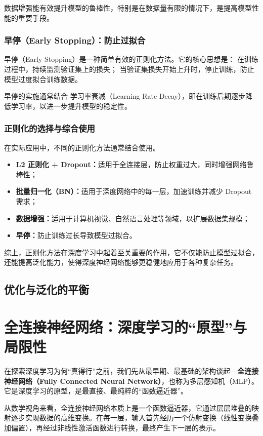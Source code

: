 数据增强能有效提升模型的鲁棒性，特别是在数据量有限的情况下，是提高模型性能的重要手段。

\subsubsection*{早停（Early Stopping）：防止过拟合}
早停（Early Stopping）是一种简单有效的正则化方法。它的核心思想是： 在训练过程中，持续监测验证集上的损失； 当验证集损失开始上升时，停止训练，防止模型过度拟合训练数据。

早停的实施通常结合 学习率衰减（Learning Rate Decay），即在训练后期逐步降低学习率，以进一步提升模型的稳定性。

\subsubsection*{ 正则化的选择与综合使用}
在实际应用中，不同的正则化方法通常结合使用。
\begin{itemize}
\item {\bf   L2 正则化 + Dropout：}适用于全连接层，防止权重过大，同时增强网络鲁棒性；
\item {\bf   批量归一化（BN）：}适用于深度网络中的每一层，加速训练并减少 Dropout 需求；
\item {\bf  数据增强：}适用于计算机视觉、自然语言处理等领域，以扩展数据集规模；
\item {\bf  早停：}防止训练过长导致模型过拟合。
\end{itemize}
综上，正则化方法在深度学习中起着至关重要的作用，它不仅能防止模型过拟合，还能提高泛化能力，使得深度神经网络能够更稳健地应用于各种复杂任务。
 
 \subsection{优化与泛化的平衡}
 

\section{全连接神经网络：深度学习的“原型”与局限性}
在探索深度学习为何“真得行”之前，我们先从最早期、最基础的架构谈起---{\bf 全连接神经网络（Fully Connected Neural Network）}，也称为多层感知机（MLP）。它是深度学习的原型，是最直接、最纯粹的“函数逼近器”。

从数学视角来看，全连接神经网络本质上是一个函数逼近器，它通过层层堆叠的映射逐步实现数据的高维变换。在每一层，输入首先经历一个仿射变换（线性变换叠加偏置），再经过非线性激活函数进行转换，最终产生下一层的表示。

